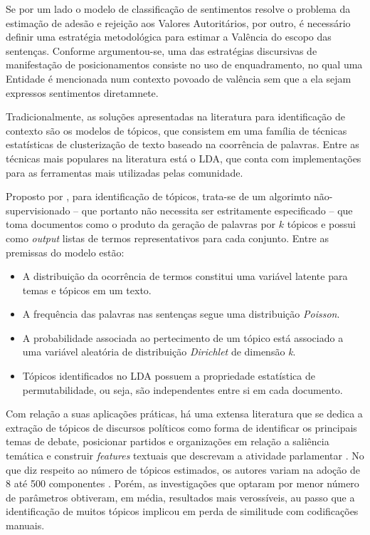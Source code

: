 \documentclass[
12pt,				%
openright,			%
twoside,			%
a4paper,			%
english,			%
french,				%
spanish,			%
brazil				%
]{abntex2}
\begin{document}
Se por um lado o modelo de classificação de sentimentos resolve o problema da estimação de adesão e rejeição aos Valores Autoritários, por outro, é necessário definir uma estratégia metodológica para estimar a Valência do escopo das sentenças. Conforme argumentou-se, uma das estratégias discursivas de manifestação de posicionamentos consiste no uso de enquadramento, no qual uma Entidade é mencionada num contexto povoado de valência sem que a ela sejam expressos sentimentos diretamnete.

Tradicionalmente, as soluções apresentadas na literatura para identificação de contexto são os modelos de tópicos, que consistem em uma família de técnicas estatísticas de clusterização de texto baseado na coorrência de palavras. Entre as técnicas mais populares na literatura está o LDA, que conta com implementações para as ferramentas mais utilizadas pelas comunidade. 

Proposto por , para identificação de tópicos, trata-se de um algorimto não-supervisionado -- que portanto não necessita ser estritamente especificado -- que toma documentos como o produto da geração de palavras por $k$ tópicos e possui como \emph{output} listas de termos representativos para cada conjunto. Entre as premissas do modelo estão:

\begin{itemize}
	\item A distribuição da ocorrência de termos constitui uma variável latente para temas e tópicos em um texto.
	\item A frequência das palavras nas sentenças segue uma distribuição \emph{Poisson}.
	\item A probabilidade associada ao pertecimento de um tópico está associado a uma variável aleatória de distribuição \emph{Dirichlet} de dimensão \emph{k}.
	\item Tópicos identificados no LDA possuem a propriedade estatística de permutabilidade, ou seja, são independentes entre si em cada documento. 
\end{itemize}

Com relação a suas aplicações práticas, há uma extensa literatura que se dedica a extração de tópicos de discursos políticos como forma de identificar os principais temas de debate, posicionar partidos e organizações em relação a saliência temática e construir \emph{features} textuais que descrevam a atividade parlamentar \cite{chen2010opinion, fang2012mining, balasubramanyan2012modeling, balasubramanyan2012modeling, cohen2013classifying, song2014analyzing, levy2014driving, van2014lda,zirn2014multidimensional, batista2016mensurando}. No que diz respeito ao número de tópicos estimados, os autores variam na adoção de 8 até 500 componentes . Porém, as investigações que optaram por menor número de parâmetros obtiveram, em média, resultados mais verossíveis, au passo que a identificação de muitos tópicos implicou em perda de similitude com codificações manuais.
\end{document}
